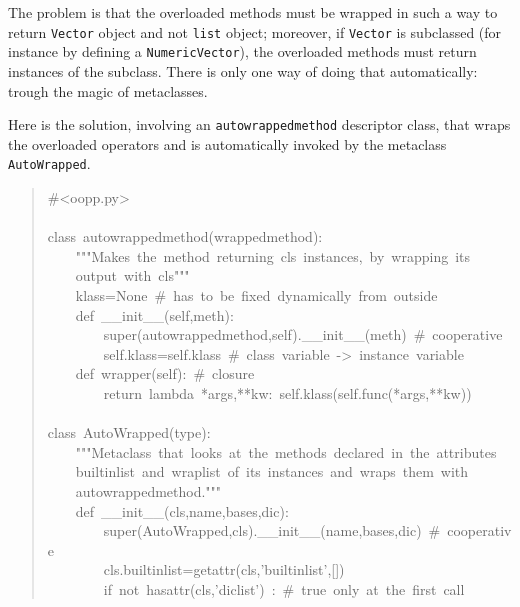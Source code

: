 \documentclass[10pt,english]{article}
\begin{document}
The problem is that the overloaded methods must be wrapped in such a way
to return \texttt{Vector} object and not \texttt{list} object; moreover, if
\texttt{Vector} is subclassed (for instance by defining a \texttt{NumericVector}),
the overloaded methods must return instances of the subclass. There is
only one way of doing that automatically: trough the magic of metaclasses.

Here is the solution, involving an \texttt{autowrappedmethod} descriptor class,
that wraps the overloaded operators and is automatically invoked by
the metaclass \texttt{AutoWrapped}.
\begin{quote}
\begin{ttfamily}\begin{flushleft}
\mbox{{\#}<oopp.py>}\\
\mbox{}\\
\mbox{class~autowrappedmethod(wrappedmethod):}\\
\mbox{~~~~"""Makes~the~method~returning~cls~instances,~by~wrapping~its}\\
\mbox{~~~~output~with~cls"""}\\
\mbox{~~~~klass=None~{\#}~has~to~be~fixed~dynamically~from~outside}\\
\mbox{~~~~def~{\_}{\_}init{\_}{\_}(self,meth):}\\
\mbox{~~~~~~~~super(autowrappedmethod,self).{\_}{\_}init{\_}{\_}(meth)~{\#}~cooperative}\\
\mbox{~~~~~~~~self.klass=self.klass~{\#}~class~variable~->~instance~variable}\\
\mbox{~~~~def~wrapper(self):~{\#}~closure}\\
\mbox{~~~~~~~~return~lambda~*args,**kw:~self.klass(self.func(*args,**kw))}\\
\mbox{}\\
\mbox{class~AutoWrapped(type):}\\
\mbox{~~~~"""Metaclass~that~looks~at~the~methods~declared~in~the~attributes~}\\
\mbox{~~~~builtinlist~and~wraplist~of~its~instances~and~wraps~them~with}\\
\mbox{~~~~autowrappedmethod."""}\\
\mbox{~~~~def~{\_}{\_}init{\_}{\_}(cls,name,bases,dic):}\\
\mbox{~~~~~~~~super(AutoWrapped,cls).{\_}{\_}init{\_}{\_}(name,bases,dic)~{\#}~cooperative}\\
\mbox{~~~~~~~~cls.builtinlist=getattr(cls,'builtinlist',[])}\\
\mbox{~~~~~~~~if~not~hasattr(cls,'diclist')~:~{\#}~true~only~at~the~first~call}\\

\end{flushleft}
\end{ttfamily}
\end{quote}
\end{document}
